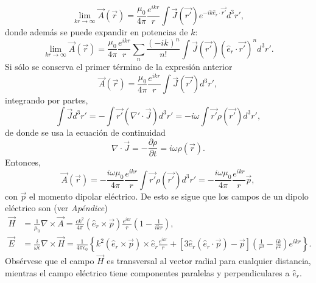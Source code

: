 \begin{equation*}
    \lim_{kr\rightarrow\infty}\Vec{A}(\Vec{r})=\frac{\mu_0}{4\pi}\frac{e^{ikr}}{r}\int \Vec{J}(\Vec{r'})e^{-ik\hat{e}_r\cdot\Vec{r'}}d^3r',    
\end{equation*}
donde además se puede expandir en potencias de $k$:
\begin{equation*}
    \lim_{kr\rightarrow\infty}\Vec{A}(\Vec{r})=\frac{\mu_0}{4\pi}\frac{e^{ikr}}{r}\sum_n\frac{(-ik)^n}{n!}\int \Vec{J}(\Vec{r'})(\hat{e}_r\cdot\Vec{r'})^n d^3r'.    
\end{equation*}
Si sólo se conserva el primer término de la expresión anterior
\begin{equation}
    \Vec{A}(\Vec{r})=\frac{\mu_0}{4\pi}\frac{e^{ikr}}{r}\int \Vec{J}(\Vec{r'}) d^3r',    
\end{equation}
integrando por partes,
$$\int\Vec{J}d^3r'=-\int \Vec{r'}(\nabla'\cdot\Vec{J})d^3r'=-i\omega\int \Vec{r'}\rho(\Vec{r'})d^3r',$$
de donde se usa la ecuación de continuidad
\begin{equation}
    \nabla\cdot\Vec{J}=-\frac{\partial\rho}{\partial t}=i\omega\rho(\Vec{r}).    
\end{equation}
Entonces, 
\begin{equation}
    \Vec{A}(\Vec{r})=-\frac{i\omega\mu_0}{4\pi}\frac{e^{ikr}}{r}\int \Vec{r'}\rho(\Vec{r'})d^3r'=-\frac{i\omega\mu_0}{4\pi}\frac{e^{ikr}}{r}\Vec{p} ,   
\end{equation}
con $\Vec{p}$ el momento dipolar eléctrico.
De esto se sigue que los campos de un dipolo eléctrico son (ver \textit{Apéndice})
\begin{align}
    \Vec{H}&=\frac{1}{\mu_0}\nabla\times\Vec{A}=\frac{ck^2}{4\pi}(\hat{e}_r\times\Vec{p})\frac{e^{ikr}}{r}\left(1-\frac{1}{ikr}\right),\\
    \Vec{E}&=\frac{i}{\omega\epsilon}\nabla\times\Vec{H}=\frac{1}{4\pi\epsilon_0}\left\{k^2(\hat{e}_r\times\Vec{p})\times\hat{e}_r\frac{e^{ikr}}{r}+[3\hat{e}_r(\hat{e}_r\cdot\Vec{p})-\Vec{p}]\left(\frac{1}{r^3}-\frac{ik}{r^2}\right)e^{ikr}\right\}.
\end{align}
Obsérvese que el campo $\Vec{H}$ es transversal al vector radial para cualquier distancia, mientras el campo eléctrico tiene componentes paralelas y perpendiculares a $\hat{e}_r$.\\

